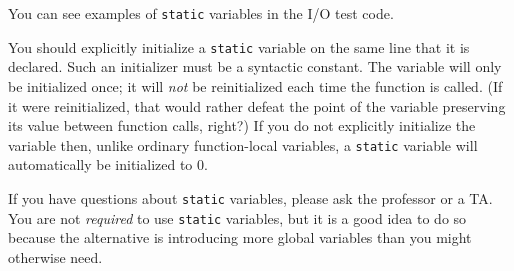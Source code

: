 You can see examples of \lstinline{static} variables in the I/O test code.

You should explicitly initialize a \lstinline{static} variable on the same line that it is declared.
Such an initializer must be a syntactic constant.
The variable will only be initialized once; it will \textit{not} be reinitialized each time the function is called.
(If it were reinitialized, that would rather defeat the point of the variable preserving its value between function calls, right?)
If you do not explicitly initialize the variable then, unlike ordinary function-local variables, a \lstinline{static} variable will automatically be initialized to 0.

If you have questions about \lstinline{static} variables, please ask the professor or a TA\@.
You are not \textit{required} to use \lstinline{static} variables, but it is a good idea to do so because the alternative is introducing more global variables than you might otherwise need.

